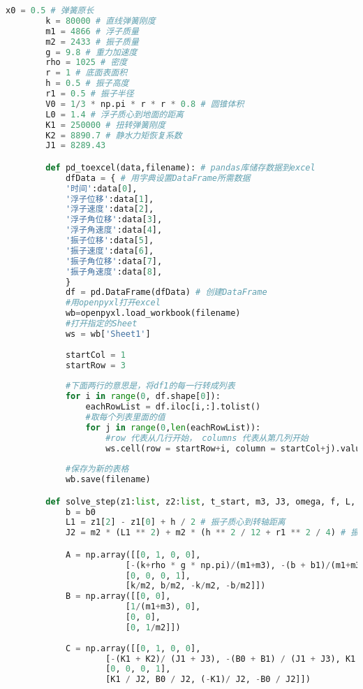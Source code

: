 \documentclass[withoutpreface,bwprint]{cumcmthesis} %
\begin{document}
\begin{appendices}
\begin{lstlisting}[language=python]
        x0 = 0.5 # 弹簧原长
        k = 80000 # 直线弹簧刚度
        m1 = 4866 # 浮子质量
        m2 = 2433 # 振子质量
        g = 9.8 # 重力加速度
        rho = 1025 # 密度
        r = 1 # 底面表面积
        h = 0.5 # 振子高度
        r1 = 0.5 # 振子半径
        V0 = 1/3 * np.pi * r * r * 0.8 # 圆锥体积
        L0 = 1.4 # 浮子质心到地面的距离
        K1 = 250000 # 扭转弹簧刚度
        K2 = 8890.7 # 静水力矩恢复系数
        J1 = 8289.43

        def pd_toexcel(data,filename): # pandas库储存数据到excel
            dfData = { # 用字典设置DataFrame所需数据
            '时间':data[0],
            '浮子位移':data[1],
            '浮子速度':data[2],
            '浮子角位移':data[3],
            '浮子角速度':data[4],
            '振子位移':data[5],
            '振子速度':data[6],
            '振子角位移':data[7],
            '振子角速度':data[8],
            }
            df = pd.DataFrame(dfData) # 创建DataFrame
            #用openpyxl打开excel
            wb=openpyxl.load_workbook(filename)
            #打开指定的Sheet
            ws = wb['Sheet1']
            
            startCol = 1
            startRow = 3
            
            #下面两行的意思是，将df1的每一行转成列表
            for i in range(0, df.shape[0]):
                eachRowList = df.iloc[i,:].tolist()
                #取每个列表里面的值
                for j in range(0,len(eachRowList)):
                    #row 代表从几行开始， columns 代表从第几列开始
                    ws.cell(row = startRow+i, column = startCol+j).value =eachRowList[j]
            
            #保存为新的表格
            wb.save(filename)

        def solve_step(z1:list, z2:list, t_start, m3, J3, omega, f, L, b1:float, B1:float, b0:float, B0:float)->list:
            b = b0
            L1 = z1[2] - z1[0] + h / 2 # 振子质心到转轴距离
            J2 = m2 * (L1 ** 2) + m2 * (h ** 2 / 12 + r1 ** 2 / 4) # 振子的转动惯量

            A = np.array([[0, 1, 0, 0], 
                        [-(k+rho * g * np.pi)/(m1+m3), -(b + b1)/(m1+m3), k/(m1+m3), b/(m1+m3)], 
                        [0, 0, 0, 1], 
                        [k/m2, b/m2, -k/m2, -b/m2]])
            B = np.array([[0, 0], 
                        [1/(m1+m3), 0], 
                        [0, 0], 
                        [0, 1/m2]])
            
            C = np.array([[0, 1, 0, 0],
                    [-(K1 + K2)/ (J1 + J3), -(B0 + B1) / (J1 + J3), K1 / (J1 + J3), B0 /(J1 + J3)],
                    [0, 0, 0, 1],
                    [K1 / J2, B0 / J2, (-K1)/ J2, -B0 / J2]])
            

\end{lstlisting}
\end{appendices}
\end{document}
